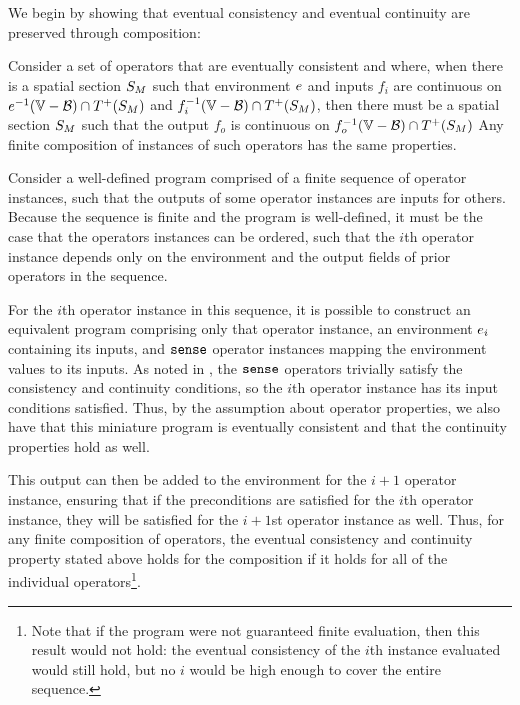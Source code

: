 \documentclass[12pt,a4paper,twoside,openright]{book}
\begin{document}
\begin{appendices}
We begin by showing that eventual consistency and eventual continuity are preserved through composition:

\begin{lem}\label{thm:compose}
  Consider a set of operators that are eventually consistent and where, when there is a spatial section $S_{M}$ such that environment $e$ and inputs $f_i$ are continuous on $\validdomain{\environment} \cap \futureof{\sectionof{\manifold}}$ and  $\validdomain{\field_i} \cap \futureof{\sectionof{\manifold}}$, then there must be a spatial section $S_{M}$ such that the output $f_o$ is continuous on $\validdomain{\field_o} \cap \futureof{\sectionof{\manifold}}$
  Any finite composition of instances of such operators has the same properties.
\end{lem}
  Consider a well-defined program comprised of a finite sequence of operator instances, such that the outputs of some operator instances are inputs for others.  Because the sequence is finite and the program is well-defined, it must be the case that the operators instances can be ordered, such that the $i$th operator instance depends only on the environment and the output fields of prior operators in the sequence.

  For the $i$th operator instance in this sequence, it is possible to construct an equivalent program comprising only that operator instance, an environment $e_i$ containing its inputs, and $\texttt{sense}$ operator instances mapping the environment values to its inputs.
  As noted in , the $\texttt{sense}$ operators trivially satisfy the consistency and continuity conditions, so the $i$th operator instance has its input conditions satisfied.
  Thus, by the assumption about operator properties, we also have that this miniature program is eventually consistent and that the continuity properties hold as well.

  This output can then be added to the environment for the $i+1$ operator instance, ensuring that if the preconditions are satisfied for the $i$th operator instance, they will be satisfied for the $i+1$st operator instance as well.
  Thus, for any finite composition of operators, the eventual consistency and continuity property stated above holds for the composition if it holds for all of the individual operators\footnote{Note that if the program were not guaranteed finite evaluation, then this result would not hold: the eventual consistency of the $i$th instance evaluated would still hold, but no $i$ would be high enough to cover the entire sequence.}.


\end{appendices}
\end{document}
